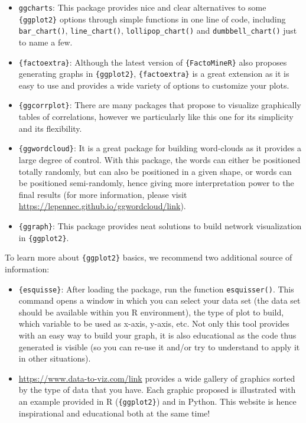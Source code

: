 \documentclass[
]{book}
\providecommand{\tightlist}{%
  \setlength{\itemsep}{0pt}\setlength{\parskip}{0pt}}
\begin{document}
\begin{itemize}
\tightlist
\item
  \texttt{ggcharts}: This package provides nice and clear alternatives to some \texttt{\{ggplot2\}} options through simple functions in one line of code, including \texttt{bar\_chart()}, \texttt{line\_chart()}, \texttt{lollipop\_chart()} and \texttt{dumbbell\_chart()} just to name a few.
\item
  \texttt{\{factoextra\}}: Although the latest version of \texttt{\{FactoMineR\}} also proposes generating graphs in \texttt{\{ggplot2\}}, \texttt{\{factoextra\}} is a great extension as it is easy to use and provides a wide variety of options to customize your plots.
\item
  \texttt{\{ggcorrplot\}}: There are many packages that propose to visualize graphically tables of correlations, however we particularly like this one for its simplicity and its flexibility.
\item
  \texttt{\{ggwordcloud\}}: It is a great package for building word-clouds as it provides a large degree of control. With this package, the words can either be positioned totally randomly, but can also be positioned in a given shape, or words can be positioned semi-randomly, hence giving more interpretation power to the final results (for more information, please visit \url{https://lepennec.github.io/ggwordcloud/}\href{https://lepennec.github.io/ggwordcloud/}{link}).
\item
  \texttt{\{ggraph\}}: This package provides neat solutions to build network visualization in \texttt{\{ggplot2\}}.
\end{itemize}

To learn more about \texttt{\{ggplot2\}} basics, we recommend two additional source of information:

\begin{itemize}
\tightlist
\item
  \texttt{\{esquisse\}}: After loading the package, run the function \texttt{esquisser()}. This command opens a window in which you can select your data set (the data set should be available within you R environment), the type of plot to build, which variable to be used as x-axis, y-axis, etc. Not only this tool provides with an easy way to build your graph, it is also educational as the code thus generated is visible (so you can re-use it and/or try to understand to apply it in other situations).
\item
  \url{https://www.data-to-viz.com/}\href{https://www.data-to-viz.com/}{link} provides a wide gallery of graphics sorted by the type of data that you have. Each graphic proposed is illustrated with an example provided in R (\texttt{\{ggplot2\}}) and in Python. This website is hence inspirational and educational both at the same time!
\end{itemize}
\end{document}
